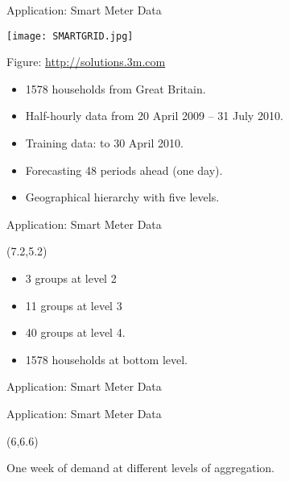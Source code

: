 \documentclass[14pt]{beamer}
\begin{document}
\begin{frame}{Application: Smart Meter Data}

\centerline{\texttt{[image: SMARTGRID.jpg]} }
  \vspace{-.85cm}
  \begin{flushright}
    { \tiny Figure: \url{http://solutions.3m.com}}
  \end{flushright}\vspace*{-0.5cm}\fontsize{12}{13}\sf

\begin{itemize}
  \item 1578 households from Great Britain.
  \item Half-hourly data from 20 April 2009 -- 31 July 2010.
  \item Training data: to 30 April 2010. 
  \item Forecasting 48 periods ahead (one day).
  \item Geographical hierarchy with five levels.
\end{itemize}

\end{frame}

\begin{frame}{Application: Smart Meter Data}
\begin{textblock}{5.1}(7.2,5.2)
\begin{block}{}
\begin{itemize}
  \item 3 groups at level 2
  \item 11 groups at level 3
  \item 40 groups at level 4.
  \item 1578 households at bottom level.
\end{itemize}
\end{block}
\end{textblock}
\end{frame}


\begin{frame}{Application: Smart Meter Data}
\end{frame}

\begin{frame}{Application: Smart Meter Data}
\begin{textblock}{5}(6,6.6)
\begin{block}{}
One week of demand at different levels of aggregation.
\end{block}
\end{textblock}
\end{frame}
\end{document}

